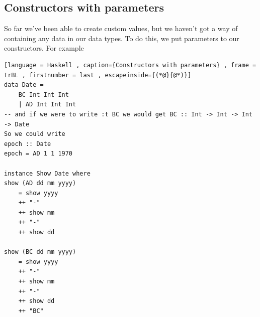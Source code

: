 \documentclass[a4paper]{article}
\theoremstyle{plain}
\theoremstyle{definition}
\theoremstyle{remark}
\begin{document}
\subsection{Constructors with parameters}
So far we've been able to create custom values, but we haven't got a way of containing any data in our data types. To do this, we put parameters to our constructors. For example
\begin{lstlisting}[language = Haskell , caption={Constructors with parameters} , frame = trBL , firstnumber = last , escapeinside={(*@}{@*)}]
data Date = 
	BC Int Int Int
	| AD Int Int Int
-- and if we were to write :t BC we would get BC :: Int -> Int -> Int -> Date
So we could write
epoch :: Date
epoch = AD 1 1 1970

instance Show Date where
show (AD dd mm yyyy)
	= show yyyy
	++ "-"
	++ show mm
	++ "-"
	++ show dd

show (BC dd mm yyyy)
	= show yyyy
	++ "-"
	++ show mm
	++ "-"
	++ show dd
	++ "BC"
\end{lstlisting}
\end{document}
